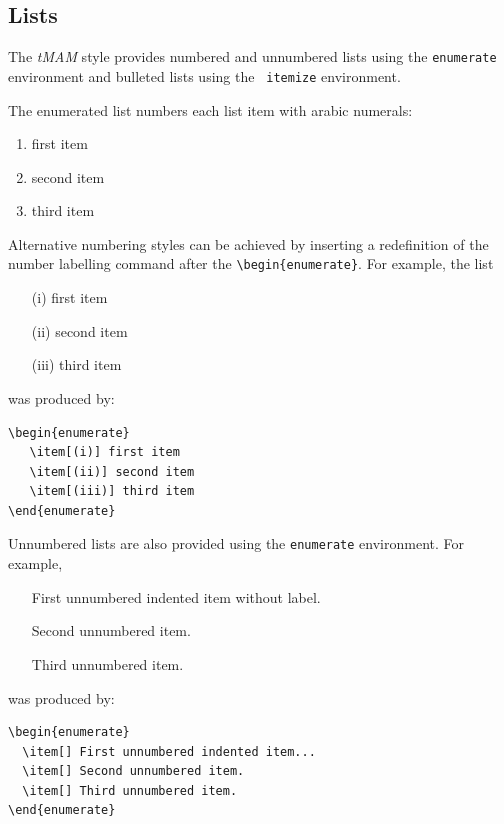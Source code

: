 \documentclass[]{tMAM2e}
\begin{document}

\subsection{Lists}

The {\it tMAM} style provides numbered and unnumbered lists using
the {\tt enumerate} environment and bulleted lists  using the {\tt
itemize} environment.

The enumerated list numbers each list item with arabic numerals:
%
\begin{enumerate}
   \item first item
   \item second item
   \item third item
\end{enumerate}
%
Alternative numbering styles can be achieved by inserting a redefinition of the number labelling command after
the \verb"\begin{enumerate}". For example, the list
%
\begin{enumerate}
   \item[(i)] first item
   \item[(ii)] second item
   \item[(iii)] third item

\end{enumerate}
%
was produced by:
%
\begin{verbatim}
\begin{enumerate}
   \item[(i)] first item
   \item[(ii)] second item
   \item[(iii)] third item
\end{enumerate}
\end{verbatim}
%
Unnumbered lists are also provided using the {\tt enumerate} environment.
For example,
\begin{enumerate}
   \item[] First unnumbered indented item without label.
   \item[] Second unnumbered item.
   \item[] Third unnumbered item.
\end{enumerate}
was produced by:
%
\begin{verbatim}
\begin{enumerate}
  \item[] First unnumbered indented item...
  \item[] Second unnumbered item.
  \item[] Third unnumbered item.
\end{enumerate}
\end{verbatim}
\end{document}
